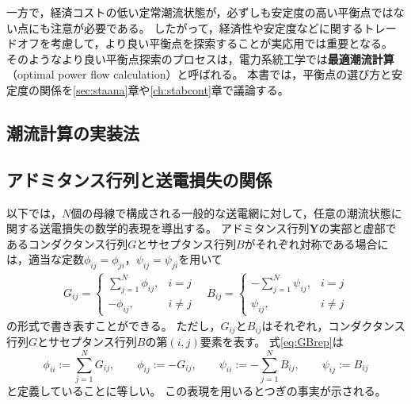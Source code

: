 \documentclass[tombow,dvipdfmx]{corona-a5-1.1}
\begin{document}
一方で，経済コストの低い定常潮流状態が，必ずしも安定度の高い平衡点ではない点にも注意が必要である。
したがって，経済性や安定度などに関するトレードオフを考慮して，より良い平衡点を探索することが実応用では重要となる。
そのようなより良い平衡点探索のプロセスは，電力系統工学では\textbf{最適潮流計算}（optimal power flow calculation）と呼ばれる。
本書では，平衡点の選び方と安定度の関係を\ref{sec:staana}章や\ref{ch:stabcont}章で議論する。

\subsection{潮流計算の実装法}


\subsection{アドミタンス行列と送電損失の関係\advanced}

以下では，$N$個の母線で構成される一般的な送電網に対して，任意の潮流状態に関する送電損失の数学的表現を導出する。
アドミタンス行列$\bm{Y}$の実部と虚部であるコンダクタンス行列$G$とサセプタンス行列$B$がそれぞれ対称である場合には，適当な定数$\phi_{ij}=\phi_{ji}$，$\psi_{ij}=\psi_{ji}$を用いて
\begin{align}\label{eq:GBrep}
G_{ij} =
\left\{
\begin{array}{cl}
\textstyle \sum_{j=1}^{N} \phi_{ij}, & i=j \\
-\phi_{ij}, & i\neq j 
\end{array}
\right.
\quad
B_{ij}  =
\left\{
\begin{array}{cl}
\textstyle - \sum_{j=1}^{N} \psi_{ij}, & i=j \\
\psi_{ij}, & i\neq j 
\end{array}
\right.
\end{align}
の形式で書き表すことができる。
ただし，$G_{ij}$と$B_{ij}$はそれぞれ，コンダクタンス行列$G$とサセプタンス行列$B$の第$(i,j)$要素を表す。
式\ref{eq:GBrep}は
\[
\phi_{ii}:= \sum_{j=1}^N G_{ij},\qquad
\phi_{ij}:=-G_{ij},\qquad 
\psi_{ii}:= - \sum_{j=1}^N B_{ij},\qquad 
\psi_{ij}:=B_{ij}
\]
と定義していることに等しい。
この表現を用いるとつぎの事実が示される。
\end{document}
